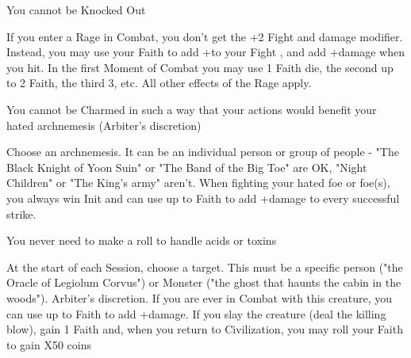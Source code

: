 {

You cannot be Knocked Out


If you enter a Rage in Combat, you don't get the +2 Fight and damage modifier.  Instead, you may use your Faith to add +\DICE to your Fight \RO, and add +\DICE damage when you hit.  In the first Moment of Combat you may use 1 Faith die, the second up to 2 Faith, the third 3, etc. All other effects of the Rage apply.




\GOD[
Name=Justicia,
Link=small-god-justicia,
GodOf=Seraph of Vengeance,
Holy=An image or symbol of something the Devotee wants vengeance against
]


You cannot be Charmed in such a way that your actions would benefit your hated archnemesis (Arbiter's discretion)


Choose an archnemesis.  It can be an individual person or group of people  - "The Black Knight of Yoon Suin" or "The Band of the Big Toe" are OK,  "Night Children" or "The King's army" aren't.   When fighting your hated foe or foe(s), you always win Init and can use up to \LVL Faith to add +\SUMDICE damage to every successful strike. 




\GOD[
Name=Kos,
Link=small-god-kos,
GodOf=Archon of Mercenaries and Assassins,
Holy=3 rusted iron coins sewn or welded to a bracelet on the dominant hand
]


You never need to make a \DEX roll to handle acids or toxins


At the start of each Session, choose a target.  This must be a specific person ("the Oracle of Legiolum Corvus") or Monster ("the ghost that haunts the cabin in the woods").  Arbiter's discretion. If you are ever in Combat with this creature, you can use up to \LVL Faith to add +\SUMDICE damage.  If you slay the creature (deal the killing blow), gain 1 Faith and, when you return to Civilization, you may roll your Faith to gain \DICE X50 coins




\GOD[
Name=Odin,
Link=small-god-odin,
GodOf=Archon of Strategy and Combat,
Holy=3 interlocking triangles worn as a necklace from a chain
]

}
